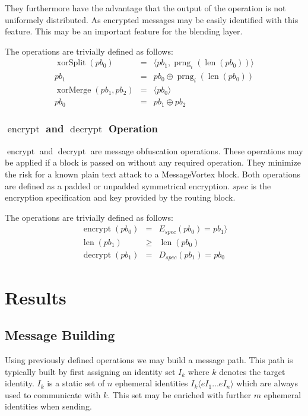 \documentclass[9pt,journal,compsoc]{IEEEtran}
\DeclareMathOperator{\prng}{prng}
\DeclareMathOperator{\len}{len}
\DeclareMathOperator{\xorSplit}{xorSplit}
\DeclareMathOperator{\xorMerge}{xorMerge}
\DeclareMathOperator{\encrypt}{encrypt}
\DeclareMathOperator{\decrypt}{decrypt}
\begin{document}
They furthermore have the advantage that the output of the operation is not uniformely distributed. As encrypted messages may be easily identified with this feature. This may be an important feature for the blending layer.

The operations are trivially defined as follows:
\begin{eqnarray}
\xorSplit(pb_0) & = &\langle pb_1, \prng_i(\len(pb_0)) \rangle\\
pb_1 & = & pb_0 \oplus \prng_i(\len(pb_0))\\
\xorMerge(pb_1,pb_2) & = &\langle pb_0 \rangle\\
pb_0 & = & pb_1 \oplus pb_2
\end{eqnarray}

\subsubsection{$\encrypt$ and $\decrypt$ Operation}
$\encrypt$ and $\decrypt$ are message obfuscation operations. These operations may be applied if a block is passed on without any required operation. They minimize the risk for a known plain text attack to a MessageVortex block. Both operations are defined as a padded or unpadded symmetrical encryption. $spec$ is the encryption specification and key provided by the routing block.

The operations are trivially defined as follows:
\begin{eqnarray}
\encrypt(pb_0) & = &E_{spec}(pb_0) =pb_1 \rangle\\
\len(pb_1) & \geq & \len(pb_0)\\
\decrypt(pb_1) & = &D_{spec}(pb_1)= pb_0
\end{eqnarray}

\section{Results}
\subsection{Message Building}
Using previously defined operations we may build a message path. This path is typically built by first assigning an identity set $I_k$ where  $k$ denotes the target identity. $I_k$ is a static set of $n$ ephemeral identities $I_k\langle eI_1 \ldots eI_n\rangle$ which are always used to communicate with $k$. This set may be enriched with further $m$ ephemeral identities when sending. 
\end{document}
